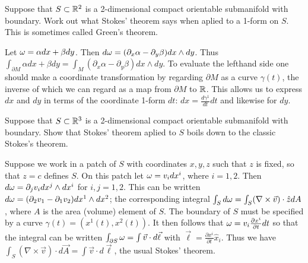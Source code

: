 \documentclass[a4paper,12pt]{report}
\numberwithin{equation}{section}
\begin{document}
\begin{p}%
{Suppose that $S\subset \mathbb{R}^2$ is a 2-dimensional compact orientable submanifold with boundary. Work out what Stokes' theorem says when aplied to a 1-form on $S$. This is sometimes called
Green's theorem.}
\end{p}
{Let $\omega=\alpha dx+\beta dy$. Then $d\omega=(\partial_x \alpha-\partial_y\beta)dx\wedge dy$. Thus $\int_{\partial M}\alpha dx+\beta dy=\int_M (\partial_x \alpha-\partial_y\beta)dx\wedge dy$. To evaluate the lefthand side one should
make a coordinate transformation by regarding $\partial M$ as a curve $\gamma(t)$, the
inverse of which we can regard as a map from $\partial M$ to $\mathbb{R}$. This allows us 
to express $dx$ and $dy$ in terms of the coordinate 1-form $dt$: $dx=\frac{d\gamma^1}{dt}dt$ and likewise for $dy$.}

\begin{p}%
{Suppose that $S\subset \mathbb{R}^3$ is a 2-dimensional compact orientable submanifold with boundary. Show that Stokes' theorem aplied to $S$ boils down to the classic Stokes's theorem.}
\end{p}
{Suppose we work in a patch of $S$ with coordinates $x,y,z$ such that $z$ is fixed, so that $z=c$ defines $S$. On this patch let $\omega=v_i dx^i$, where $i=1,2$. Then $d\omega=\partial_j v_i dx^j\wedge dx^i$ for $i,j=1,2$. This can 
be written $d\omega=(\partial_2 v_1-\partial_1 v_2)dx^1\wedge dx^2$; the corresponding integral $\int_S d\omega=\int_S (\nabla\times \vec{v})\cdot \hat{z}dA$, where $A$ is the area 
(volume) element of $S$. The boundary of $S$ must be specified by a curve $\gamma(t)=(x^1(t),x^2(t))$. It then follows that $\omega=v_i\frac{\partial x^i}{\partial t}dt$ so that the integral can be written $\int_{\partial S}\omega=\int \vec{v}\cdot d\vec{\ell}$ with $\vec{\ell}=\frac{\partial x^i}{\partial t}\hat{x}_i$. Thus we have
 $\int_S (\nabla\times \vec{v})\cdot d\vec{A}=\int \vec{v}\cdot d\vec{\ell}$, the usual Stokes' theorem.}
\end{document}
